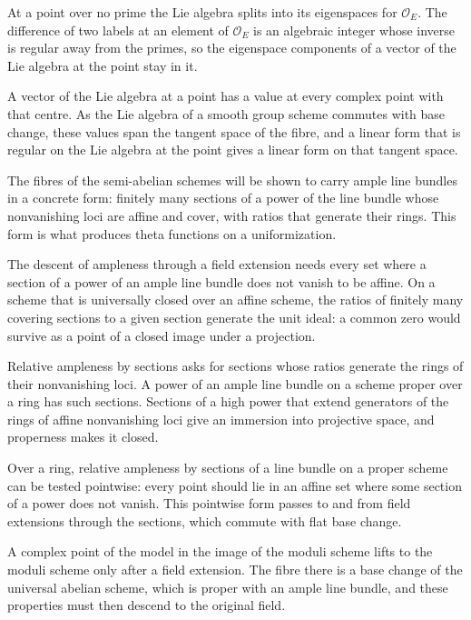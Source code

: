 At a point over no prime the Lie algebra splits into its eigenspaces for $\mathcal O_E$. The difference of two labels at
an element of $\mathcal O_E$ is an algebraic integer whose inverse is regular away from the primes, so the eigenspace
components of a vector of the Lie algebra at the point stay in it.

A vector of the Lie algebra at a point has a value at every complex point with that centre. As the Lie algebra of a
smooth group scheme commutes with base change, these values span the tangent space of the fibre, and a linear form
that is regular on the Lie algebra at the point gives a linear form on that tangent space.

The fibres of the semi-abelian schemes will be shown to carry ample line bundles in a concrete form: finitely many sections of
a power of the line bundle whose nonvanishing loci are affine and cover, with ratios that generate their rings. This form
is what produces theta functions on a uniformization.

The descent of ampleness through a field extension needs every set where a section of a power of an ample line bundle does
not vanish to be affine. On a scheme that is universally closed over an affine scheme, the ratios of finitely many covering
sections to a given section generate the unit ideal: a common zero would survive as a point of a closed image under a
projection.

Relative ampleness by sections asks for sections whose ratios generate the rings of their nonvanishing loci. A power of an
ample line bundle on a scheme proper over a ring has such sections. Sections of a high power that extend generators of the
rings of affine nonvanishing loci give an immersion into projective space, and properness makes it closed.

Over a ring, relative ampleness by sections of a line bundle on a proper scheme can be tested pointwise: every point should
lie in an affine set where some section of a power does not vanish. This pointwise form passes to and from field extensions
through the sections, which commute with flat base change.

A complex point of the model in the image of the moduli scheme lifts to the moduli scheme only after a field extension. The
fibre there is a base change of the universal abelian scheme, which is proper with an ample line bundle, and these
properties must then descend to the original field.


